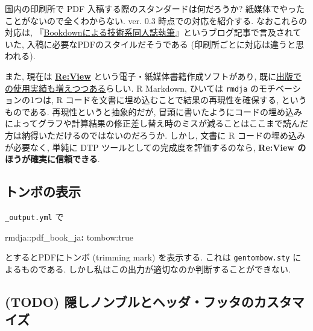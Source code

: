 \documentclass[
]{bxjsbook}
\newenvironment{Shaded}{\begin{snugshade}}{\end{snugshade}}
\newcommand{\AttributeTok}[1]{\textcolor[rgb]{0.77,0.63,0.00}{#1}}
\newcommand{\FunctionTok}[1]{\textcolor[rgb]{0.00,0.00,0.00}{#1}}
\newcommand{\KeywordTok}[1]{\textcolor[rgb]{0.13,0.29,0.53}{\textbf{#1}}}
\theoremstyle{definition}
\theoremstyle{definition}
\theoremstyle{definition}
\theoremstyle{remark}
\begin{document}
国内の印刷所で PDF 入稿する際のスタンダードは何だろうか?
紙媒体でやったことがないので全くわからない. ver. 0.3
時点での対応を紹介する. なおこれらの対応は,
『\href{https://teastat.blogspot.com/2019/01/bookdown.html}{Bookdownによる技術系同人誌執筆}』というブログ記事で言及されていた,
入稿に必要なPDFのスタイルだそうである
(印刷所ごとに対応は違うと思われる).

また, 現在は \href{https://reviewml.org/ja/}{\textbf{Re:View}}
という電子・紙媒体書籍作成ソフトがあり,
既に\href{https://github.com/kmuto/review/wiki/\%E5\%88\%A9\%E7\%94\%A8\%E5\%AE\%9F\%E7\%B8\%BE}{出版での使用実績も増えつつある}らしい.
R Markdown, ひいては \texttt{rmdja} のモチベーションの1つは, R
コードを文書に埋め込むことで結果の再現性を確保する, というものである.
再現性というと抽象的だが,
冒頭に書いたようにコードの埋め込みによってグラフや計算結果の修正差し替え時のミスが減ることはここまで読んだ方は納得いただけるのではないのだろうか.
しかし, 文書に R コードの埋め込みが必要なく, 単純に DTP
ツールとしての完成度を評価するのなら, \textbf{Re:View
のほうが確実に信頼できる}.

\hypertarget{ux30c8ux30f3ux30dcux306eux8868ux793a}{%
\subsection{トンボの表示}\label{ux30c8ux30f3ux30dcux306eux8868ux793a}}

\texttt{\_output.yml} で

\begin{Shaded}
\begin{Highlighting}[]
\AttributeTok{rmdja:}\FunctionTok{:pdf\_book\_ja}\KeywordTok{:}
\AttributeTok{  tombow:true}
\end{Highlighting}
\end{Shaded}

とするとPDFにトンボ (trimming mark) を表示する. これは
\texttt{gentombow.sty} によるものである.
しかし私はこの出力が適切なのか判断することができない.

\hypertarget{todo-ux96a0ux3057ux30ceux30f3ux30d6ux30ebux3068ux30d8ux30c3ux30c0ux30d5ux30c3ux30bfux306eux30abux30b9ux30bfux30deux30a4ux30ba}{%
\subsection{(TODO)
隠しノンブルとヘッダ・フッタのカスタマイズ}\label{todo-ux96a0ux3057ux30ceux30f3ux30d6ux30ebux3068ux30d8ux30c3ux30c0ux30d5ux30c3ux30bfux306eux30abux30b9ux30bfux30deux30a4ux30ba}}
\end{document}
